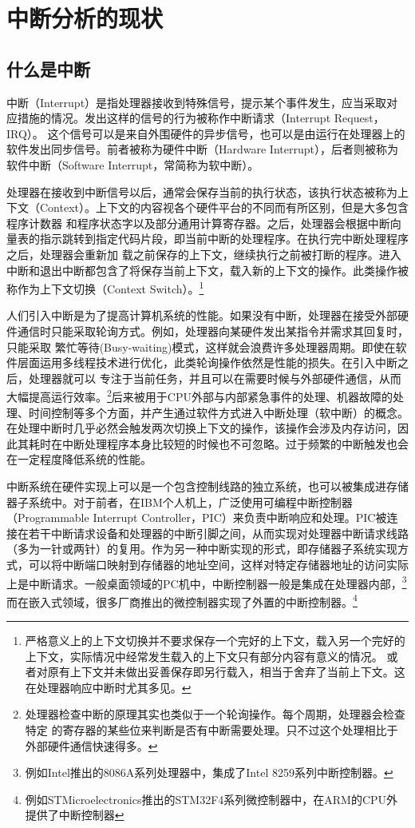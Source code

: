 
\chapter{中断分析的现状}

\section{什么是中断}
中断（Interrupt）是指处理器接收到特殊信号，提示某个事件发生，应当采取对应措施的情况。发出这样的信号的行为被称作中断请求（Interrupt Request，IRQ）。
这个信号可以是来自外围硬件的异步信号，也可以是由运行在处理器上的软件发出同步信号。前者被称为硬件中断（Hardware Interrupt），后者则被称为软件中断（Software Interrupt，常简称为软中断）。

处理器在接收到中断信号以后，通常会保存当前的执行状态，该执行状态被称为上下文（Context）。上下文的内容视各个硬件平台的不同而有所区别，但是大多包含程序计数器
和程序状态字以及部分通用计算寄存器。之后，处理器会根据中断向量表的指示跳转到指定代码片段，即当前中断的处理程序。在执行完中断处理程序之后，处理器会重新加
载之前保存的上下文，继续执行之前被打断的程序。进入中断和退出中断都包含了将保存当前上下文，载入新的上下文的操作。此类操作被称作为上下文切换（Context Switch）。\footnote{严格意义上的上下文切换并不要求保存一个完好的上下文，载入另一个完好的上下文，实际情况中经常发生载入的上下文只有部分内容有意义的情况。
或者对原有上下文并未做出妥善保存即另行载入，相当于舍弃了当前上下文。这在处理器响应中断时尤其多见。}

人们引入中断是为了提高计算机系统的性能。如果没有中断，处理器在接受外部硬件通信时只能采取轮询方式。例如，处理器向某硬件发出某指令并需求其回复时，只能采取
繁忙等待(Busy-waiting)模式，这样就会浪费许多处理器周期。即使在软件层面运用多线程技术进行优化，此类轮询操作依然是性能的损失。在引入中断之后，处理器就可以
专注于当前任务，并且可以在需要时候与外部硬件通信，从而大幅提高运行效率。\footnote{处理器检查中断的原理其实也类似于一个轮询操作。每个周期，处理器会检查特定
的寄存器的某些位来判断是否有中断需要处理。只不过这个处理相比于外部硬件通信快速得多。}后来被用于CPU外部与内部紧急事件的处理、机器故障的处理、时间控制等多个方面，并产生通过软件方式进入中断处理（软中断）的概念。在处理中断时几乎必然会触发两次切换上下文的操作，该操作会涉及内存访问，因此其耗时在中断处理程序本身比较短的时候也不可忽略。过于频繁的中断触发也会在一定程度降低系统的性能。

中断系统在硬件实现上可以是一个包含控制线路的独立系统，也可以被集成进存储器子系统中。对于前者，在IBM个人机上，广泛使用可编程中断控制器（Programmable Interrupt Controller，PIC）来负责中断响应和处理。PIC被连接在若干中断请求设备和处理器的中断引脚之间，从而实现对处理器中断请求线路（多为一针或两针）的复用。作为另一种中断实现的形式，即存储器子系统实现方式，可以将中断端口映射到存储器的地址空间，这样对特定存储器地址的访问实际上是中断请求。一般桌面领域的PC机中，中断控制器一般是集成在处理器内部，\footnote{例如Intel推出的8086A系列处理器中，集成了Intel 8259系列中断控制器。}而在嵌入式领域，很多厂商推出的微控制器实现了外置的中断控制器。\footnote{例如STMicroelectronics推出的STM32F4系列微控制器中，在ARM的CPU外提供了中断控制器}

